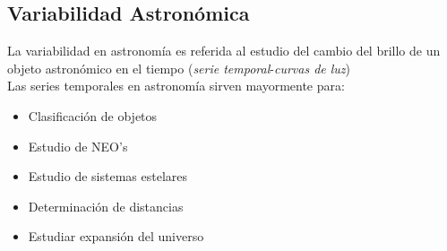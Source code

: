 \documentclass[10pt]{beamer}
\begin{document}
\subsection{Variabilidad Astron\'omica}
\begin{frame}
La variabilidad en astronom\'{i}a es referida al estudio del cambio del brillo de un 
objeto astron\'omico en el tiempo \pause (\textit{serie temporal}-\textit{curvas de luz}) \\ 
\bigskip
Las series temporales en astronom\'{i}a sirven mayormente para:
\begin{itemize}
\item Clasificaci\'on de objetos 
\item Estudio de NEO's 
\item Estudio de sistemas estelares 
\item Determinaci\'on de distancias 
\item Estudiar expansi\'on del universo
\end{itemize}
\end{frame}
\end{document}
